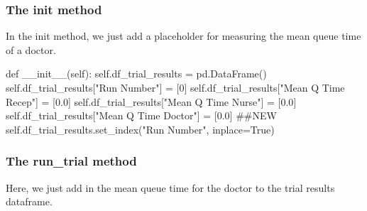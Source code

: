 \documentclass[
  letterpaper,
  DIV=11,
  numbers=noendperiod]{scrreprt}
\newenvironment{Shaded}{}{}
\newcommand{\CommentTok}[1]{\textcolor[rgb]{0.42,0.45,0.49}{#1}}
\newcommand{\DecValTok}[1]{\textcolor[rgb]{0.00,0.36,0.77}{#1}}
\newcommand{\FloatTok}[1]{\textcolor[rgb]{0.00,0.36,0.77}{#1}}
\newcommand{\FunctionTok}[1]{\textcolor[rgb]{0.44,0.26,0.76}{#1}}
\newcommand{\KeywordTok}[1]{\textcolor[rgb]{0.84,0.23,0.29}{#1}}
\newcommand{\NormalTok}[1]{\textcolor[rgb]{0.14,0.16,0.18}{#1}}
\newcommand{\OperatorTok}[1]{\textcolor[rgb]{0.14,0.16,0.18}{#1}}
\newcommand{\StringTok}[1]{\textcolor[rgb]{0.01,0.18,0.38}{#1}}
\newcommand{\VariableTok}[1]{\textcolor[rgb]{0.89,0.38,0.04}{#1}}
\begin{document}
\subsubsection{\texorpdfstring{The \textbf{init}
method}{The init method}}\label{the-init-method-1}

In the init method, we just add a placeholder for measuring the mean
queue time of a doctor.

\begin{Shaded}
\begin{Highlighting}[]
\KeywordTok{def}  \FunctionTok{\_\_init\_\_}\NormalTok{(}\VariableTok{self}\NormalTok{):}
    \VariableTok{self}\NormalTok{.df\_trial\_results }\OperatorTok{=}\NormalTok{ pd.DataFrame()}
    \VariableTok{self}\NormalTok{.df\_trial\_results[}\StringTok{"Run Number"}\NormalTok{] }\OperatorTok{=}\NormalTok{ [}\DecValTok{0}\NormalTok{]}
    \VariableTok{self}\NormalTok{.df\_trial\_results[}\StringTok{"Mean Q Time Recep"}\NormalTok{] }\OperatorTok{=}\NormalTok{ [}\FloatTok{0.0}\NormalTok{]}
    \VariableTok{self}\NormalTok{.df\_trial\_results[}\StringTok{"Mean Q Time Nurse"}\NormalTok{] }\OperatorTok{=}\NormalTok{ [}\FloatTok{0.0}\NormalTok{]}
    \VariableTok{self}\NormalTok{.df\_trial\_results[}\StringTok{"Mean Q Time Doctor"}\NormalTok{] }\OperatorTok{=}\NormalTok{ [}\FloatTok{0.0}\NormalTok{] }\CommentTok{\#\#NEW}
    \VariableTok{self}\NormalTok{.df\_trial\_results.set\_index(}\StringTok{"Run Number"}\NormalTok{, inplace}\OperatorTok{=}\VariableTok{True}\NormalTok{)}
\end{Highlighting}
\end{Shaded}

\subsubsection{The run\_trial method}\label{the-run_trial-method}

Here, we just add in the mean queue time for the doctor to the trial
results dataframe.
\end{document}
